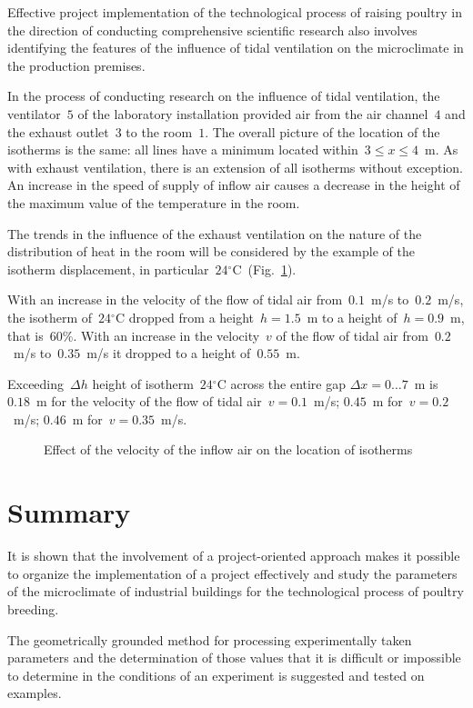 \documentclass[12pt,twoside]{article}
\newcommand{\FigRef}[2][]{(Fig.~\ref{#2}\textit{#1})}
\newcommand{\degC}{{}^{\circ}\text{C}} %
\begin{document}
\begin{JGGarticle}
			Effective project implementation of the technological process of raising poultry in the direction of conducting comprehensive scientific research also involves identifying the features of the influence of tidal ventilation on the microclimate in the production premises.
			
			In the process of conducting research on the influence of tidal ventilation, the ventilator~$5$ of the laboratory installation provided air from the air channel~$4$ and the exhaust outlet~$3$ to the room~$1$. The overall picture of the location of the isotherms is the same: all lines have a minimum located within~$3 \leq x \leq 4$~m. As with exhaust ventilation, there is an extension of all isotherms without exception. An increase in the speed of supply of inflow air causes a decrease in the height of the maximum value of the temperature in the room.
			
			The trends in the influence of the exhaust ventilation on the nature of the distribution of heat in the room will be considered by the example of the isotherm displacement, in particular~$24\degC$~\FigRef{fig:v}.
			
			With an increase in the velocity of the flow of tidal air from~$0.1$~m/s to~$0.2$~m/s, the isotherm of~$24\degC$ dropped from a height~$h = 1.5$~m to a height of~$h = 0.9$~m, that is~$60\%$. With an increase in the velocity~$v$ of the flow of tidal air from~$0.2$~m/s to~$0.35$~m/s it dropped to a height of~$0.55$~m.
			
			Exceeding~$\Delta h$ height of isotherm~$24\degC$ across the entire gap $\Delta x = 0 \dotso 7$~m is~$0.18$~m for the velocity of the flow of tidal air~$v = 0.1$~m/s; $0.45$~m for~$v = 0.2$~m/s; $0.46$~m for~$v = 0.35$~m/s.
			\begin{figure}[!hbt]
				\caption{Effect of the velocity of the inflow air on the location of isotherms}
				\label{fig:v}
			\end{figure}
		\section{Summary}
			It is shown that the involvement of a project-oriented approach makes it possible to organize the implementation of a project effectively and study the parameters of the microclimate of industrial buildings for the technological process of poultry breeding.
			
			The geometrically grounded method for processing experimentally taken parameters and the determination of those values that it is difficult or impossible to determine in the conditions of an experiment is suggested and tested on examples.
			

\end{JGGarticle}
\end{document}
